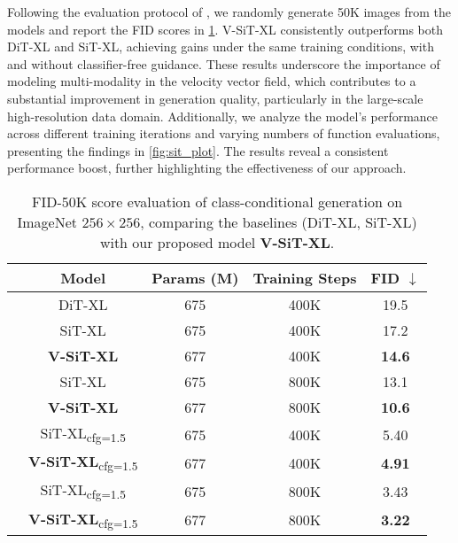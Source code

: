 Following the evaluation protocol of \citet{ma2024sit}, we randomly generate 50K images from the models and report the FID scores in \cref{tab:cond_imagenet_sit}. V-SiT-XL consistently outperforms both DiT-XL and SiT-XL, achieving   gains under the same training conditions, with and without classifier-free guidance. These results underscore the importance of modeling multi-modality in the velocity vector field, which contributes to a substantial improvement in generation quality, particularly in the large-scale high-resolution data domain. Additionally, we analyze the model's performance across different training iterations and varying numbers of function evaluations, presenting the findings in \cref{fig:sit_plot}. The results reveal a consistent performance boost, further highlighting the effectiveness of our approach. 










\begin{table}[t]
\vspace{-3mm}
    \small
    \centering
    \setlength{\tabcolsep}{4pt}
    \begin{tabular}{ccccc}
        \toprule
        & Model & Params (M) & Training Steps & FID $\downarrow$ \\
        \midrule
        & DiT-XL  & 675 & 400K & 19.5 \\
        & SiT-XL  & 675 & 400K & 17.2\\
        & \textbf{V-SiT-XL}   & 677 & 400K & \textbf{14.6}\\
        \midrule
        & SiT-XL  & 675 & 800K & 13.1\\
        & \textbf{V-SiT-XL}  & 677 & 800K & \textbf{10.6}\\
        \midrule
        & SiT-XL\textsubscript{cfg=1.5}  & 675 & 400K & 5.40\\
        & \textbf{V-SiT-XL}\textsubscript{cfg=1.5}  & 677 & 400K & \textbf{4.91}\\
        \midrule
        & SiT-XL\textsubscript{cfg=1.5}  & 675 & 800K & 3.43\\
        & \textbf{V-SiT-XL}\textsubscript{cfg=1.5}  & 677 & 800K & \textbf{3.22}\\
        \bottomrule
    \end{tabular}
    \vspace{-2mm}
    \caption{FID-50K score evaluation of class-conditional generation on ImageNet $256\times256$, comparing the baselines (DiT-XL, SiT-XL) with our proposed model \textbf{V-SiT-XL}.}
    \label{tab:cond_imagenet_sit}
    \vspace{-1mm}
\end{table}



